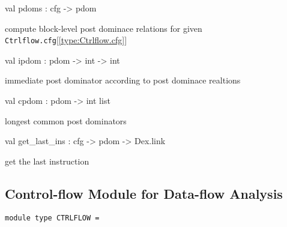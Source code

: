 \documentclass[11pt]{article}
\begin{document}
\label{val:Ctrlflow.pdoms}\begin{ocamldoccode}
val pdoms : cfg -> pdom
\end{ocamldoccode}
\begin{ocamldocdescription}
compute block-level post dominace relations for given {\tt{Ctrlflow.cfg}}[\ref{type:Ctrlflow.cfg}]


\end{ocamldocdescription}




\label{val:Ctrlflow.ipdom}\begin{ocamldoccode}
val ipdom : pdom -> int -> int
\end{ocamldoccode}
\begin{ocamldocdescription}
immediate post dominator according to post dominace realtions


\end{ocamldocdescription}




\label{val:Ctrlflow.cpdom}\begin{ocamldoccode}
val cpdom : pdom -> int list
\end{ocamldoccode}
\begin{ocamldocdescription}
longest common post dominators


\end{ocamldocdescription}




\label{val:Ctrlflow.get-underscorelast-underscoreins}\begin{ocamldoccode}
val get_last_ins : cfg -> pdom -> Dex.link
\end{ocamldoccode}
\begin{ocamldocdescription}
get the last instruction


\end{ocamldocdescription}




\subsection{Control-flow Module for Data-flow Analysis}




\begin{ocamldoccode}
{\tt{module type }}{\tt{CTRLFLOW}}{\tt{ = }}\end{ocamldoccode}
\label{moduletype:Ctrlflow.CTRLFLOW}
\end{document}
